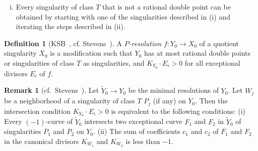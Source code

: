 \documentclass[reqno, twoside, a4paper]{amsart}
\theoremstyle{definition}
\newtheorem{definition}[theorem]{Definition}
\newtheorem{remark}[theorem]{Remark}
\numberwithin{equation}{section}
\begin{document}
\begin{enumerate}[(i)]
\begin{equation*}
\begin{tikzpicture}
\draw [-] (10)--(20);
\draw [-] (20)--(250);
\draw [dotted] (20)--(350);
\draw [-] (30)--(350);
\draw [-] (350)--(450);
\end{tikzpicture}
%
\text{~and~}
%
\begin{tikzpicture}
 \node[bullet] (10) at (1,0) [label=above:{$-b_1-1$}] {};
 \node[bullet] (20) at (2,0) [label=above:{$-b_2$}] {};

\node[empty] (250) at (2.5,0) [] {};
\node[empty] (30) at (3,0) [] {};

 \node[bullet] (350) at (3.5,0) [label=above:{$-b_r$}] {};
 \node[bullet] (450) at (4.5,0) [label=above:{$-2$}] {};

\draw [-] (10)--(20);
\draw [-] (20)--(250);
\draw [dotted] (20)--(350);
\draw [-] (30)--(350);
\draw [-] (350)--(450);
\end{tikzpicture}
\end{equation*}

\item Every singularity of class $T$ that is not a rational double point can be obtained by starting with one of the singularities described in (i) and iterating the steps described in (ii).
\end{enumerate}

\begin{definition}[{KSB~\cite[Definition~3.8]{KSB-1988}}, cf. Stevens~\cite{Stevens-1993}]
\label{definition:P-resolution}
A \emph{$P$-resolution} $f \colon Y_0 \rightarrow X_0$ of a quotient singularity $X_0$ is a modification such that $Y_0$ has at most rational double points or singularities of class $T$ as singularities, and $K_{Y_0} \cdot E_i >0$ for all exceptional divisors $E_i$ of $f$.
\end{definition}

\begin{remark}[cf.~{Stevens~\cite[p.8]{Stevens-1993}}]
Let $\widetilde{Y}_0 \to Y_0$ be the minimal resolutions of $Y_0$. Let $W_j$ be a neighborhood of a singularity of class $T$ $P_j$ (if any) on $Y_0$. Then the intersection condition $K_{Y_0} \cdot E_i > 0$ is equivalent to the following conditions: (i) Every $(-1)$-curve of $\widetilde{Y}_0$ intersects two exceptional curve $F_1$ and $F_2$ in $\widetilde{Y}_0$ of singularities $P_1$ and $P_2$ on $Y_0$. (ii) The sum of coefficients $c_1$ and $c_2$ of $F_1$ and $F_2$ in the canonical divisors $K_{W_1}$ and $K_{W_2}$ is less than $-1$.
\end{remark}
\end{document}
